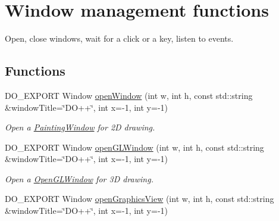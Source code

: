 \hypertarget{group___window_management}{\section{Window management functions}
\label{group___window_management}
}


Open, close windows, wait for a click or a key, listen to events.  


\subsection*{Functions}
\begin{DoxyCompactItemize}
\item 
\hypertarget{group___window_management_ga0351d84c2f76eafe9ecbad9f28a2bd84}{D\-O\-\_\-\-E\-X\-P\-O\-R\-T Window \hyperlink{group___window_management_ga0351d84c2f76eafe9ecbad9f28a2bd84}{open\-Window} (int w, int h, const std\-::string \&window\-Title=\char`\"{}D\-O++\char`\"{}, int x=-\/1, int y=-\/1)}\label{group___window_management_ga0351d84c2f76eafe9ecbad9f28a2bd84}

\begin{DoxyCompactList}\small\item\em Open a \hyperlink{class_d_o_1_1_painting_window}{Painting\-Window} for 2\-D drawing. \end{DoxyCompactList}\item 
\hypertarget{group___window_management_ga54aa2a7fc6c38dc8f1cd7c08cf253aa8}{D\-O\-\_\-\-E\-X\-P\-O\-R\-T Window \hyperlink{group___window_management_ga54aa2a7fc6c38dc8f1cd7c08cf253aa8}{open\-G\-L\-Window} (int w, int h, const std\-::string \&window\-Title=\char`\"{}D\-O++\char`\"{}, int x=-\/1, int y=-\/1)}\label{group___window_management_ga54aa2a7fc6c38dc8f1cd7c08cf253aa8}

\begin{DoxyCompactList}\small\item\em Open a \hyperlink{class_d_o_1_1_open_g_l_window}{Open\-G\-L\-Window} for 3\-D drawing. \end{DoxyCompactList}\item 
\hypertarget{group___window_management_ga6bc2d961019076295185e819b956dc48}{D\-O\-\_\-\-E\-X\-P\-O\-R\-T Window \hyperlink{group___window_management_ga6bc2d961019076295185e819b956dc48}{open\-Graphics\-View} (int w, int h, const std\-::string \&window\-Title=\char`\"{}D\-O++\char`\"{}, int x=-\/1, int y=-\/1)}\label{group___window_management_ga6bc2d961019076295185e819b956dc48}


\end{DoxyCompactItemize}
